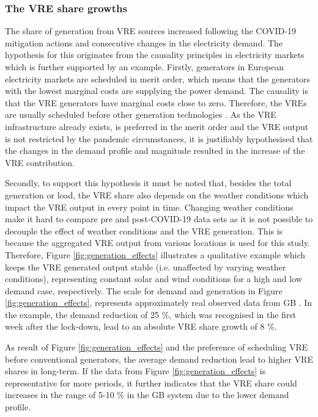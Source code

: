 \documentclass[energies,article,submit,moreauthors,pdftex]{Definitions/mdpi}
\begin{document}
\subsubsection{The VRE share growths}
The share of generation from VRE sources increased following the COVID-19 mitigation actions and consecutive changes in the electricity demand. The hypothesis for this originates from the causality principles in electricity markets which is further supported by an example. 
Firstly, generators in European electricity markets are scheduled in merit order, which means that the generators with the lowest marginal costs are supplying the power demand. The causality is that the VRE generators have marginal costs close to zero. Therefore, the VREs are usually scheduled before other generation technologies \cite{Winkler2016ImpactMatter}. As the VRE infrastructure already exists, is preferred in the merit order and the VRE output is not restricted by the pandemic circumstances, it is justifiably hypothesised that the changes in the demand profile and magnitude resulted in the increase of the VRE contribution. 

Secondly, to support this hypothesis it must be noted that, besides the total generation or load, the VRE share also depends on the weather conditions which impact the VRE output in every point in time. Changing weather conditions make it hard to compare pre and post-COVID-19 data sets as it is not possible to decouple the effect of weather conditions and the VRE generation. This is because the aggregated VRE output from various locations is used for this study. Therefore, Figure \ref{fig:generation_effects} illustrates a qualitative example which keeps the VRE generated output stable (i.e. unaffected by varying weather conditions), representing constant solar and wind conditions for a high and low demand case, respectively. 
The scale for demand and generation in Figure \ref{fig:generation_effects}, represents approximately real observed data from GB \cite{ENTSO-E2020ENTSO-EPlatform}. In the example, the demand reduction of 25 \%, which was recognised in the first week after the lock-down, lead to an absolute VRE share growth of 8 \%.

As result of Figure \ref{fig:generation_effects} and the preference of scheduling VRE before conventional generators, the average demand reduction lead to higher VRE shares in long-term. If the data from Figure \ref{fig:generation_effects} is representative for more periods, it further indicates that the VRE share could increases in the range of 5-10 \% in the GB system due to the lower demand profile.
\end{document}
